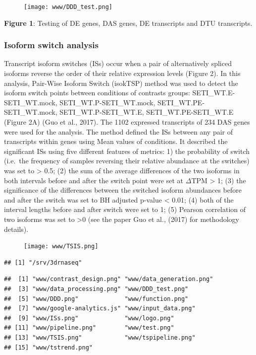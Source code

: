 \documentclass[]{article}
\begin{document}
\begin{figure}[htbp]
\centering
\texttt{[image: www/DDD\_test.png]}
\caption{}
\end{figure}

\textbf{Figure 1}: Testing of DE genes, DAS genes, DE transcripts and
DTU transcripts.

\subsubsection{Isoform switch analysis}\label{isoform-switch-analysis}

Transcript isoform switches (ISs) occur when a pair of alternatively
spliced isoforms reverse the order of their relative expression levels
(Figure 2). In this analysis, Pair-Wise Isoform Switch (isokTSP) method
was used to detect the isoform switch points between conditions of
contrasts groups: SETI\_WT.E-SETI\_WT.mock, SETI\_WT.P-SETI\_WT.mock,
SETI\_WT.PE-SETI\_WT.mock, SETI\_WT.P-SETI\_WT.E, SETI\_WT.PE-SETI\_WT.E
(Figure 2A) (Guo et al., 2017). The 1102 expressed transcripts of 234
DAS genes were used for the analysis. The method defined the ISs between
any pair of transcripts within genes using Mean values of conditions. It
described the significant ISs using five different features of metrics:
1) the probability of switch (i.e.~the frequency of samples reversing
their relative abundance at the switches) was set to \textgreater{} 0.5;
(2) the sum of the average differences of the two isoforms in both
intervals before and after the switch point were set at \(\Delta\)TPM
\textgreater{} 1; (3) the significance of the differences between the
switched isoform abundances before and after the switch was set to BH
adjusted p-value \textless{} 0.01; (4) both of the interval lengths
before and after switch were set to 1; (5) Pearson correlation of two
isoforms was set to \textgreater{}0 (see the paper Guo et al., (2017)
for methodology details).

\begin{figure}[htbp]
\centering
\texttt{[image: www/TSIS.png]}
\caption{}
\end{figure}

\begin{verbatim}
## [1] "/srv/3drnaseq"
\end{verbatim}

\begin{verbatim}
##  [1] "www/contrast_design.png" "www/data_generation.png"
##  [3] "www/data_processing.png" "www/DDD_test.png"       
##  [5] "www/DDD.png"             "www/function.png"       
##  [7] "www/google-analytics.js" "www/input_data.png"     
##  [9] "www/ISs.png"             "www/logo.png"           
## [11] "www/pipeline.png"        "www/test.png"           
## [13] "www/TSIS.png"            "www/tspipeline.png"     
## [15] "www/tstrend.png"
\end{verbatim}
\end{document}
